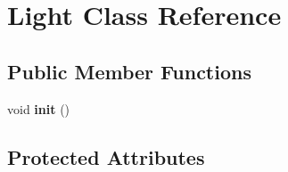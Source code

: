 \hypertarget{class_light}{\section{Light Class Reference}
\label{class_light}
}
\subsection*{Public Member Functions}
\begin{DoxyCompactItemize}
\item 
\hypertarget{class_light_a55223800cebd711b1f8e8b66c1472910}{void {\bfseries init} ()}\label{class_light_a55223800cebd711b1f8e8b66c1472910}

\end{DoxyCompactItemize}
\subsection*{Protected Attributes}
